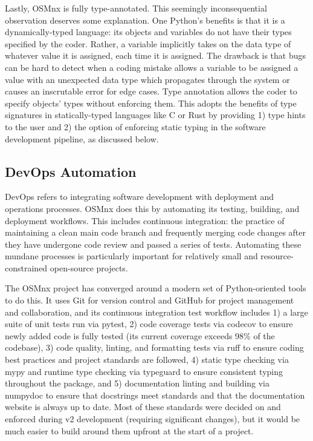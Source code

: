 \documentclass[12pt,letterpaper]{article} %
\begin{document}
Lastly, OSMnx is fully type-annotated. This seemingly inconsequential observation deserves some explanation. One Python's benefits is that it is a dynamically-typed language: its objects and variables do not have their types specified by the coder. Rather, a variable implicitly takes on the data type of whatever value it is assigned, each time it is assigned. The drawback is that bugs can be hard to detect when a coding mistake allows a variable to be assigned a value with an unexpected data type which propagates through the system or causes an inscrutable error for edge cases. Type annotation allows the coder to specify objects' types without enforcing them. This adopts the benefits of type signatures in statically-typed languages like C or Rust by providing 1) type hints to the user and 2) the option of enforcing static typing in the software development pipeline, as discussed below.

\subsection{DevOps Automation}

DevOps refers to integrating software development with deployment and operations processes. OSMnx does this by automating its testing, building, and deployment workflows. This includes continuous integration: the practice of maintaining a clean main code branch and frequently merging code changes after they have undergone code review and passed a series of tests. Automating these mundane processes is particularly important for relatively small and resource-constrained open-source projects.

The OSMnx project has converged around a modern set of Python-oriented tools to do this. It uses Git for version control and GitHub for project management and collaboration, and its continuous integration test workflow includes 1) a large suite of unit tests run via pytest, 2) code coverage tests via codecov to ensure newly added code is fully tested (its current coverage exceeds 98\% of the codebase), 3) code quality, linting, and formatting tests via ruff to ensure coding best practices and project standards are followed, 4) static type checking via mypy and runtime type checking via typeguard to ensure consistent typing throughout the package, and 5) documentation linting and building via numpydoc to ensure that docstrings meet standards and that the documentation website is always up to date. Most of these standards were decided on and enforced during v2 development (requiring significant changes), but it would be much easier to build around them upfront at the start of a project.
\end{document}
